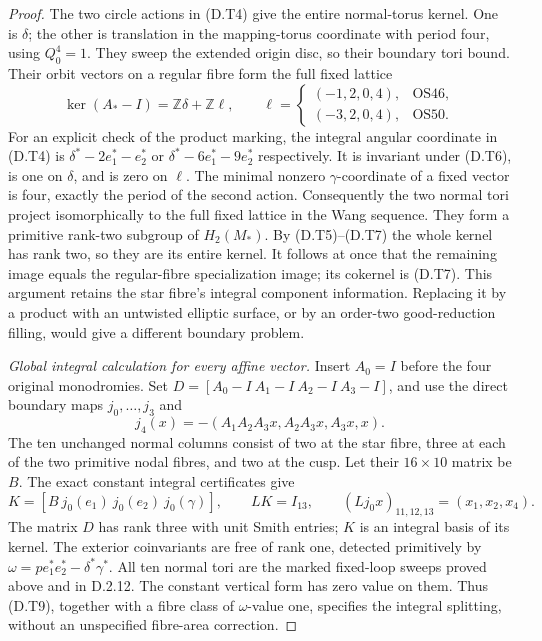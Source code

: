 \begin{proof}
The two circle actions in (D.T4) give the entire normal-torus
kernel. One is $\delta$; the other is translation in the
mapping-torus coordinate with period four, using $Q_0^4=1$.
They sweep the extended origin disc, so their boundary tori
bound. Their orbit vectors on a regular fibre form the full
fixed lattice
\[
 \ker(A_*-I)=\mathbb Z\delta+\mathbb Z\ell,\qquad
 \ell=\begin{cases}(-1,2,0,4),&\mathrm{OS46},\\
                   (-3,2,0,4),&\mathrm{OS50}.
       \end{cases}
 \tag{D.T8}
\]
For an explicit check of the product marking, the integral
angular coordinate in (D.T4) is
$\delta^*-2e_1^*-e_2^*$ or
$\delta^*-6e_1^*-9e_2^*$ respectively. It is invariant
under (D.T6), is one on $\delta$, and is zero on $\ell$.
The minimal nonzero $\gamma$-coordinate of a fixed vector
is four, exactly the period of the second action.
Consequently the two normal tori project isomorphically to
the full fixed lattice in the Wang sequence. They form a
primitive rank-two subgroup of $H_2(M_*)$. By (D.T5)--(D.T7)
the whole kernel has rank two, so they are its entire kernel.
It follows at once that the remaining image equals the
regular-fibre specialization image; its cokernel is (D.T7).
This argument retains the star fibre's integral component
information. Replacing it by a product with an untwisted
elliptic surface, or by an order-two good-reduction filling,
would give a different boundary problem.

\emph{Global integral calculation for every affine vector.}
Insert $A_0=I$ before the four original monodromies. Set
$D=[A_0-I\ A_1-I\ A_2-I\ A_3-I]$, and use the direct
boundary maps $j_0,\ldots,j_3$ and
\[
 j_4(x)=-(A_1A_2A_3x,A_2A_3x,A_3x,x).
\]
The ten unchanged normal columns consist of two at the
star fibre, three at each of the two primitive nodal fibres,
and two at the cusp. Let their $16\times10$ matrix be $B$.
The exact constant integral certificates give
\[
 K=[B\ j_0(e_1)\ j_0(e_2)\ j_0(\gamma)],\qquad
 LK=I_{13},\qquad
 (Lj_0x)_{11,12,13}=(x_1,x_2,x_4).
 \tag{D.T9}
\]
The matrix $D$ has rank three with unit Smith entries;
$K$ is an integral basis of its kernel. The exterior
coinvariants are free of rank one, detected primitively by
$\omega=p e_1^*e_2^*-\delta^*\gamma^*$.
All ten normal tori are the marked fixed-loop sweeps proved
above and in D.2.12. The constant vertical form has zero
value on them. Thus (D.T9), together with a fibre class of
$\omega$-value one, specifies the integral splitting,
without an unspecified fibre-area correction.


\end{proof}
